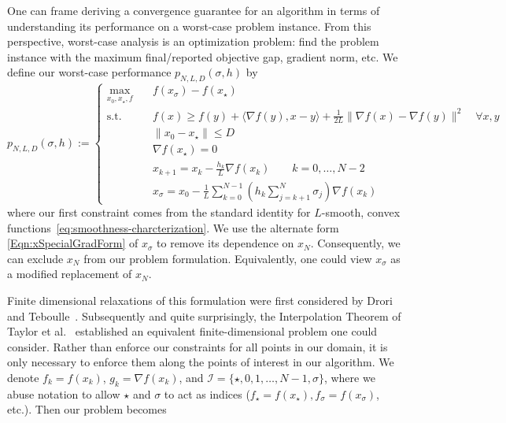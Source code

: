 \documentclass[11pt]{article}
\numberwithin{equation}{section}
\theoremstyle{definition}
\theoremstyle{definition}
\theoremstyle{definition}
\newcommand{\1}{\mathbf{1}}
\newcommand{\xStar}{x_\star}
\newcommand{\xSpecial}{x_\sigma}
\newcommand{\idxSpecial}{\sigma}
\begin{document}
One can frame deriving a convergence guarantee for an algorithm in terms of understanding its performance on a worst-case problem instance. From this perspective, worst-case analysis is an optimization problem: find the problem instance with the maximum final/reported objective gap, gradient norm, etc. We define our worst-case performance $p_{N,L,D}(\sigma,h)$ by
\begin{equation}
    p_{N,L,D}(\sigma,h) := \begin{cases} \max_{x_0,\xStar,f} \quad  & f(\xSpecial) - f(\xStar) \\
                    \text{s.t.} \quad & f(x)\geq f(y)+\langle \nabla f(y),x-y\rangle +\frac{1}{2L}\|\nabla f(x) - \nabla f(y)\|^2 \quad \forall x,y \\
                    &\|x_0-\xStar\| \leq D \\
                    &\nabla f(\xStar) = 0 \\
                    &x_{k+1} = x_k - \frac{h_k}{L}\nabla f(x_k) \quad \quad k=0,\dots,N-2\\
                    &\xSpecial = x_0 - \frac{1}{L} \sum_{k=0}^{N-1} \left(h_k \sum_{j=k+1}^N \sigma_j\right) \nabla f(x_k)
                \end{cases}
\end{equation}
where our first constraint comes from the standard identity for $L$-smooth, convex functions~\eqref{eq:smoothness-charcterization}. We use the alternate form \eqref{Eqn:xSpecialGradForm} of $\xSpecial$ to remove its dependence on $x_N$. Consequently, we can exclude $x_N$ from our problem formulation. Equivalently, one could view $\xSpecial$ as a modified replacement of $x_N$.

Finite dimensional relaxations of this formulation were first considered by Drori and Teboulle~\cite{FirstPEP}. Subsequently and quite surprisingly, the Interpolation Theorem of Taylor et al.~\cite{Interpolation} established an equivalent finite-dimensional problem one could consider. Rather than enforce our constraints for all points in our domain, it is only necessary to enforce them along the points of interest in our algorithm. We denote $f_k = f(x_k)$, $g_k = \nabla f(x_k)$, and $\mathcal{I}=\{\star,0,1,\dots,N-1,\idxSpecial\}$, where we abuse notation to allow $\star$ and $\sigma$ to act as indices ($f_\star = f(x_\star), f_\sigma = f(x_\sigma)$, etc.). Then our problem becomes
\end{document}
